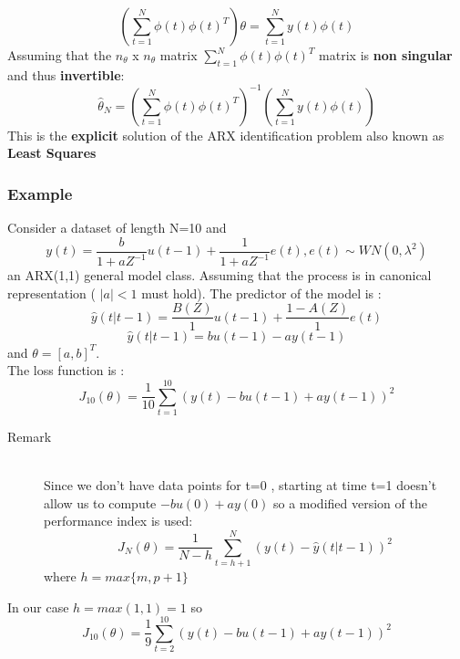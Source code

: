 $$ (\sum\limits_{t=1}^{N} \phi(t)\phi(t)^T)\theta = \sum\limits_{t=1}^{N} y(t) \phi
(t)$$
Assuming that the $n_{\theta} $ x $ n_{\theta} $ matrix $\sum\limits_{t=1}^{N}\phi(t)\phi(t)^T$ matrix is \textbf{non singular } and thus \textbf{invertible}:
\[
\boxed{\hat{\theta}_N= (\sum\limits_{t=1}^{N}\phi(t)\phi(t)^T)^{-1}(\sum\limits_{t=1}^{N}y(t)\phi(t))}
\] 
This is the \textbf{explicit} solution of the ARX identification problem also known as \textbf{Least Squares}

\subsubsection{Example}
Consider a dataset of length N=10 and 
$$ y(t) = \frac{b}{1+aZ^{-1}}u(t-1)+\frac{1}{1+aZ^{-1}}e(t), e(t) \sim WN(0,\lambda^2)$$
an ARX(1,1) general model class.
Assuming that the process is in canonical representation ( $|a|<1$ must hold).
The predictor of the model is :
$$ \hat{y}(t|t-1)= \frac{B(Z)}{1}u(t-1)+\frac{1-A(Z)}{1}e(t)$$
\[
\boxed{\hat{y}(t|t-1)=bu(t-1)-ay(t-1)}
\]
and $\theta= [a,b]^T$.\\
The loss function is :
$$ J_{10}(\theta) = \frac{1}{10}\sum\limits_{t=1}^{10}(y(t) - bu(t-1)+ay(t-1))^2$$
\begin{description}
\item[Remark]\hfill\\
Since we don't have data points for t=0 , starting at time t=1 doesn't allow us to compute $-bu(0)+ay(0)$ so a modified version of the performance index is used:
\[
\boxed{J_N(\theta)= \frac{1}{N-h}\sum\limits_{t=h+1}^{N}(y(t)-\hat{y}(t|t-1))^2}
\]
where $h=max\{m,p+1\}$
\end{description}
In our case $h=max(1,1)=1$ so 
$$ J_{10}(\theta) = \frac{1}{9}\sum\limits_{t=2}^{10}(y(t) - bu(t-1)+ay(t-1))^2$$